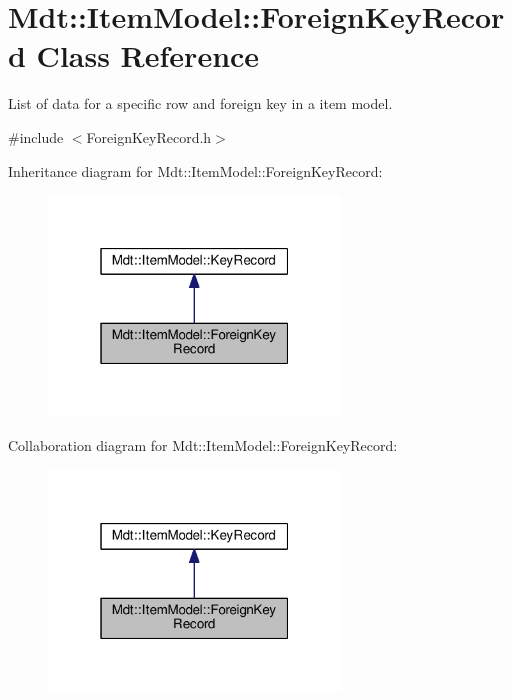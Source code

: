 \hypertarget{class_mdt_1_1_item_model_1_1_foreign_key_record}{}\section{Mdt\+:\+:Item\+Model\+:\+:Foreign\+Key\+Record Class Reference}
\label{class_mdt_1_1_item_model_1_1_foreign_key_record}


List of data for a specific row and foreign key in a item model.  




{\ttfamily \#include $<$Foreign\+Key\+Record.\+h$>$}



Inheritance diagram for Mdt\+:\+:Item\+Model\+:\+:Foreign\+Key\+Record\+:\nopagebreak
\begin{figure}[H]
\begin{center}
\leavevmode
\includegraphics[width=220pt]{class_mdt_1_1_item_model_1_1_foreign_key_record__inherit__graph}
\end{center}
\end{figure}


Collaboration diagram for Mdt\+:\+:Item\+Model\+:\+:Foreign\+Key\+Record\+:\nopagebreak
\begin{figure}[H]
\begin{center}
\leavevmode
\includegraphics[width=220pt]{class_mdt_1_1_item_model_1_1_foreign_key_record__coll__graph}
\end{center}
\end{figure}
